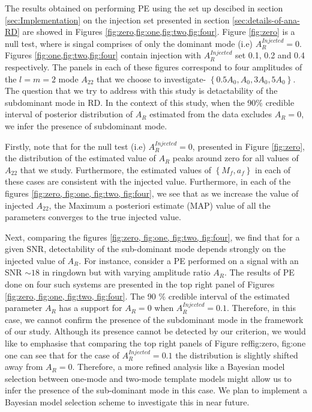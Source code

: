 The results obtained on performing PE using the set up descibed in section \ref{sec:Implementation} on the injection set presented in section \ref{sec:details-of-ana-RD} are showed in Figures \ref{fig:zero,fig:one,fig:two,fig:four}. Figure \ref{fig:zero} is a null test, where is singal comprises of only the dominant mode (i.e) $A_{R}^{Injected}=0$. Figures \ref{fig:one,fig:two,fig:four} contain injection with $A_{R}^{Injected}$ set  0.1, 0.2
 and 0.4 respectively. The panels in each of these figures correspond to four amplitudes of the $l=m=2$ mode $A_{22}$ that we choose to investigate-  $\left\lbrace 0.5 A_{0}, A_{0}, 3A_{0}, 5A_{0}\right\rbrace $. The question that we try to address with this study is detactability of the subdominant mode in RD. In the context of this study, when the 90\% credible interval of posterior distribution of $A_{R}$ estimated from the data excludes $A_{R} = 0$, we infer the presence of subdominant mode.  

Firstly, note that for the null test (i.e) $A_{R}^{Injected} =0$, presented in Figure \ref{fig:zero}, the distribution of the estimated value of $A_{R}$ peaks around zero for all values of $A_{22}$ that we study.  Furthermore, the estimated values of $ \left\lbrace M_{f},  a_{f} \right\rbrace$ in each of these cases are consistent with the injected value. Furthermore, in each of the figures \ref{fig:zero, fig:one, fig:two, fig:four}, we see that as we increase the value of injected $A_{22}$, the Maximum a posteriori estimate (MAP) value of all the parameters converges to the true injected value. 

Next, comparing the figures \ref{fig:zero, fig:one, fig:two, fig:four}, we find that for a given SNR, detectability of the sub-dominant mode depends strongly on the injected value of $A_{R}$. For instance, consider a PE performed on a signal with an SNR $\sim 18$ in ringdown but with varying amplitude ratio $A_{R}$. The results of PE done on four such systems are presented in the top right panel of Figures \ref{fig:zero, fig:one, fig:two, fig:four}.  The 90 \% credible interval of the estimated parameter $A_{R}$ has a support for $A_{R} =0$ when $A_{R}^{Injected} = 0.1$. Therefore, in this case, we cannot confirm the presence of the subdominant mode in the framework of our study. Although its presence cannot be detected by our criterion, we would like to emphasise that comparing the top right panels of Figure ref{fig:zero, fig:one} one can see that for the case of $A_{R}^{Injected} = 0.1$ the distribution is slightly shifted away from $A_{R}=0$. Therefore, a more refined analysis like a Bayesian model selection between one-mode and two-mode template models might allow us to infer the presence of the sub-dominant mode in this case. We plan to implement a Bayesian model selection scheme to investigate this in near future.  

